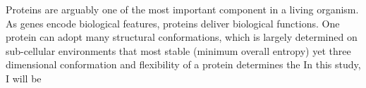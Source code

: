 Proteins are arguably one of the most important component in a living organism. As genes encode biological features, proteins deliver biological functions. One protein can adopt many structural conformations, which is largely determined on sub-cellular environments that most stable (minimum overall entropy) yet three dimensional conformation and flexibility of a protein determines the     In this study, I will be 